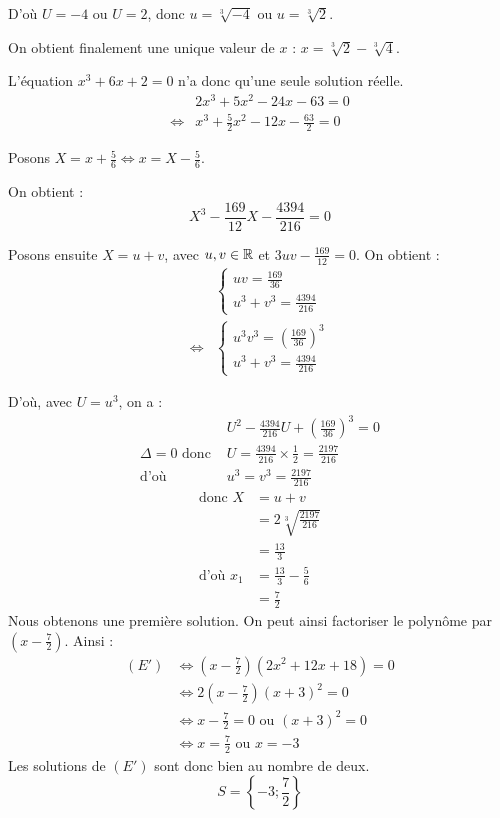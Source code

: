 \documentclass[]{../templates/homework}
\begin{document}
	D'où $U=-4$ ou $U=2$, donc $u=\sqrt[3]{-4}$ ou $u=\sqrt[3]{2}$.
	
	On obtient finalement une unique valeur de $x$ : $x=\sqrt[3]{2}-\sqrt[3]{4}$.
	
	L'équation $x^3 + 6x + 2=0$ n'a donc qu'une seule solution réelle. 
	\begin{align*}
		& 2x^3 + 5x^2 - 24x - 63 = 0 \\
		\iff & x^3 + \frac{5}{2}x^2 - 12x - \frac{63}{2} = 0
	\end{align*}
	
	Posons $X = x + \frac{5}{6} \iff x = X - \frac{5}{6}$.
	
	On obtient : $$X^3 - \frac{169}{12}X - \frac{4394}{216} = 0$$
	
	Posons ensuite $X = u + v$, avec $u, v \in \mathbb R$ et $3uv - \frac{169}{12} = 0$. On obtient :
	\begin{align*}
		&\begin{cases}
			uv = \frac{169}{36}\\
			u^3 + v^3 = \frac{4394}{216}
		\end{cases} \\
		\iff 
		&\begin{cases}
			u^3v^3 = (\frac{169}{36})^3\\
			u^3 + v^3 = \frac{4394}{216}
		\end{cases}
	\end{align*}
	
	D'où, avec $U = u^3$, on a :
	\begin{align*}
		&U^2 - \frac{4394}{216}U + \left( \frac{169}{36} \right)^3 = 0 \\
		\Delta = 0 \text{ donc } &U = \frac{4394}{216} \times \frac{1}{2} = \frac{2197}{216} \\
		\text{d'où } &u^3 = v^3 = \frac{2197}{216}
	\end{align*}
	\begin{align*}
		\text{donc } X &= u + v \\
		&= 2\sqrt[3]{\frac{2197}{216}} \\
		&= \frac{13}{3} \\
		\text{d'où } x_1 &= \frac{13}{3} - \frac{5}{6} \\
		&= \frac{7}{2}
	\end{align*}
	Nous obtenons une première solution. On peut ainsi factoriser le polynôme par $(x - \frac{7}{2})$. Ainsi :
	\begin{align*}
		(E') & \iff \left( x - \frac{7}{2} \right) (2x^2 + 12x + 18) = 0 \\
		& \iff 2 \left( x - \frac{7}{2} \right) (x+3)^2 = 0 \\
		& \iff x - \frac{7}{2} = 0 \text{ ou } (x+3)^2 = 0 \\
		& \iff x = \frac{7}{2} \text{ ou } x = -3
	\end{align*}
	Les solutions de $(E')$ sont donc bien au nombre de deux.
	$$ S = \left\{ -3 ; \frac{7}{2} \right\} $$
	
\end{document}
